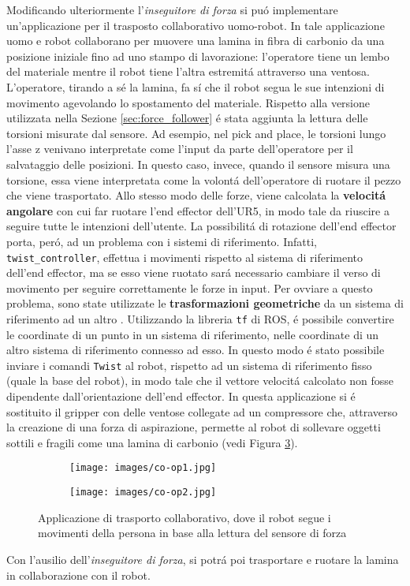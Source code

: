Modificando ulteriormente l'\textit{inseguitore di forza} si pu\'{o} implementare un'applicazione 
per il trasposto collaborativo uomo-robot\footnotemark{}. 
In tale applicazione uomo e robot collaborano per muovere una lamina in fibra di carbonio da una posizione iniziale fino ad uno stampo 
di lavorazione: l'operatore tiene un lembo del materiale mentre il robot tiene l'altra estremit\'{a} attraverso una ventosa. 
L'operatore, tirando a s\'{e} la lamina, fa s\'{i} che il robot segua le sue intenzioni di movimento agevolando lo spostamento del materiale.
Rispetto alla versione utilizzata nella Sezione \ref{sec:force_follower} \'{e} stata aggiunta 
la lettura delle torsioni misurate dal sensore. 
Ad esempio, nel pick and place, le torsioni lungo l'asse z venivano interpretate come l'input da parte dell'operatore per il salvataggio 
delle posizioni. In questo caso, invece, quando il sensore misura una torsione, essa viene interpretata come la volont\'{a} 
dell'operatore di ruotare il pezzo che viene trasportato.
Allo stesso modo delle forze, viene calcolata la \textbf{velocit\'{a} angolare} 
con cui far ruotare l'end effector dell'UR5, in modo tale da riuscire a seguire tutte le intenzioni dell'utente. 
La possibilit\'{a} di rotazione dell'end effector porta, per\'{o}, ad un problema con i sistemi di riferimento. 
Infatti, \verb|twist_controller|, effettua i movimenti rispetto al sistema di riferimento dell'end effector, ma se esso viene ruotato 
sar\'{a} necessario cambiare il verso di movimento per seguire correttamente le forze in input. Per ovviare a questo 
problema, sono state utilizzate le \textbf{trasformazioni geometriche} da un sistema di riferimento ad un altro \cite{foote2013tf}. 
Utilizzando la libreria \verb|tf| di ROS, \'{e} possibile convertire le coordinate di un punto in un sistema di riferimento, nelle 
coordinate di un altro sistema di riferimento connesso ad esso. In questo modo \'{e} stato possibile inviare i comandi 
\verb|Twist| al robot, rispetto ad un sistema di riferimento fisso (quale la base del robot), in modo tale che il vettore velocit\'{a} 
calcolato non fosse dipendente dall'orientazione dell'end effector. 
In questa applicazione si \'{e} sostituito il gripper con delle ventose collegate ad un compressore che, attraverso la creazione di 
una forza di aspirazione, permette al robot di sollevare oggetti sottili e fragili come una lamina di carbonio (vedi Figura \ref{fig:co-op}).
\begin{figure}[H]
    \centering
    \begin{subfigure}[b]{0.45\textwidth}
        \texttt{[image: images/co-op1.jpg]}
        \label{fig:co-op1}
    \end{subfigure}
    \qquad
    \begin{subfigure}[b]{0.45\textwidth}
        \texttt{[image: images/co-op2.jpg]}
        \label{fig:co-op2}
    \end{subfigure}
    \caption{Applicazione di trasporto collaborativo, dove il robot segue i movimenti della persona in base alla lettura del sensore di forza}\label{fig:co-op}
\end{figure}
Con l'ausilio dell'\textit{inseguitore di forza}, si potr\'{a} poi trasportare e ruotare la lamina in collaborazione con il robot. 
